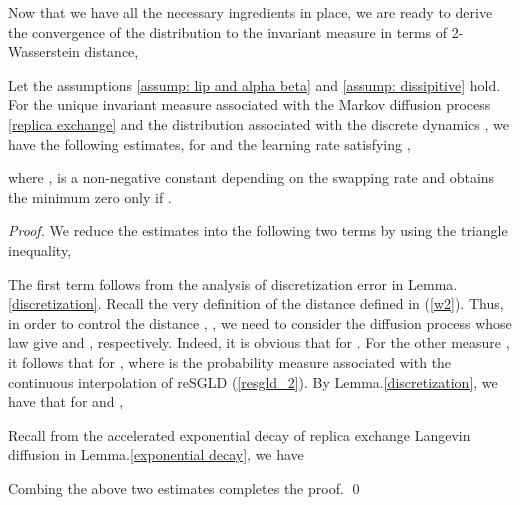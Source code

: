 Now that we have all the necessary ingredients in place, we are ready to derive the convergence of the distribution  to the invariant measure  in terms of 2-Wasserstein distance, 




\begin{theorem}Let the assumptions \eqref{assump: lip and alpha beta} and \eqref{assump: dissipitive} hold. For the unique invariant measure  associated with the Markov diffusion process \eqref{replica exchange} and the distribution  associated with the discrete dynamics , we have the following estimates, for  and the learning rate  satisfying , 

where ,  is a non-negative constant depending on the swapping rate  and obtains the minimum zero only if .
\end{theorem}{}

\begin{proof}
We reduce the estimates into the following two terms by using the triangle inequality,

The first term  follows from the analysis of discretization error in Lemma.\ref{discretization}.
Recall the very definition of the  distance defined in (\ref{w2}). Thus, in order to control the distance , , we need to consider the diffusion process whose law give  and , respectively. Indeed, it is obvious that  for . For the other measure , it follows that  for , where  is the probability measure associated with the continuous interpolation of reSGLD (\ref{resgld_2}). By Lemma.\ref{discretization}, we have that for  and , 


Recall from the accelerated exponential decay of replica exchange Langevin diffusion in Lemma.\ref{exponential decay}, we have


Combing the above two estimates completes the proof.
\qed
\end{proof}{}
